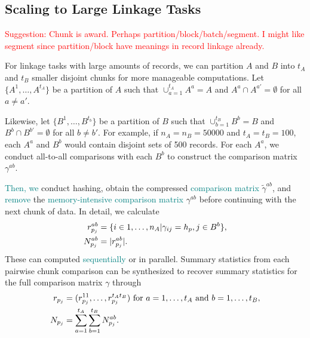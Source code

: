 \documentclass[ba]{imsart}
\begin{document}
\hypertarget{scaling}{%
	\subsection{Scaling to Large Linkage Tasks}\label{scaling}}
	
	\textcolor{red}{Suggestion: Chunk is award. Perhaps partition/block/batch/segment. I might like segment since partition/block have meanings in record linkage already. }

		For linkage tasks with large amounts of records, we can partition $A$ and $B$ into $t_A$ and $t_B$ smaller disjoint chunks for more manageable computations. Let $\{A^1, \dots, A^{t_A}\}$ be a partition of $A$ such that $\cup_{a=1}^{t_A} A^a = A$ and $A^a \cap A^{a'}=\emptyset$ for all $a \neq a'$.  
		
		Likewise, let $\{B^1, \dots, B^{t_b}\}$ be a partition of $B$ such that $\cup_{b=1}^{t_B} B^b = B$ and $B^b \cap B^{b'}=\emptyset$ for all $b \neq b'$.  For example, if $n_A = n_B = 50000$ and $t_A = t_B = 100$, each $A^a$ and $B^b$ would contain disjoint sets of 500 records. For each $A^a$, we conduct all-to-all comparisons with each $B^b$ to construct the comparison matrix $\gamma^{ab}$. 
		
		\textcolor{teal}{Then, we} conduct hashing, obtain the compressed \textcolor{teal}{comparison matrix} $\tilde{\gamma}^{ab}$, and \textcolor{teal}{remove}
		the 
\textcolor{teal}{memory-intensive}
		\textcolor{teal}{comparison matrix} $\gamma^{ab}$ 
		before continuing with the next chunk of data. 
		In detail, we calculate
\begin{subequations}
	\begin{align}
		r_{p_j}^{ab} &= \{i \in 1, \dots, n_A| \gamma_{ij} = h_p, j \in B^b\}, \label{r_{p_j}^{ab}} \\
		N_{p_j}^{ab} &= |r_{p_j}^{ab}|. \label{N_{p_j}^{ab}}
	\end{align}
\end{subequations}
These can computed \textcolor{teal}{sequentially} or in parallel. Summary statistics from each pairwise chunk comparison can be synthesized to recover summary statistics for the full comparison matrix $\gamma$ through
\begin{subequations}
	\begin{align}
		r_{p_j} &= (r_{p_j}^{11}, \ldots, r_{p_j}^{ t_A t_B}) \text{ for } a = 1, \ldots, t_A \text{ and } b = 1, \ldots, t_B, \label{r_{p_j}} \\
		N_{p_j} &= \sum_{a = 1}^{t_A} \sum_{b = 1}^{t_B} N_{p_j}^{ab}.\label{N_{p_j}}	\end{align}
\end{subequations} 
\end{document}
